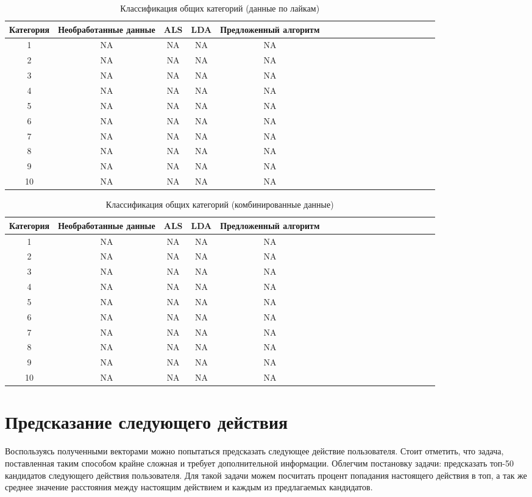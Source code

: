 \documentclass[times,specification,annotation]{itmo-student-thesis}
\begin{document}
\begin{table}[!h]
\caption{Классификация общих категорий (данные по лайкам)}\label{tab-likes}
\centering
\begin{tabular}{|*{18}{c|}}\hline
Категория & Необработанные данные & ALS & LDA & Предложенный алгоритм \\\hline
1  & NA & NA & NA & NA  \\\hline
2  & NA & NA & NA & NA \\\hline
3  & NA & NA & NA & NA \\\hline
4  & NA & NA & NA & NA \\\hline
5  & NA & NA & NA & NA  \\\hline
6  & NA & NA & NA & NA \\\hline
7  & NA & NA & NA & NA \\\hline
8  & NA & NA & NA & NA \\\hline
9  & NA & NA & NA & NA  \\\hline
10  & NA & NA & NA & NA \\\hline
\end{tabular}
\end{table}

\begin{table}[!h]
\caption{Классификация общих категорий (комбинированные данные)}\label{tab-combined}
\centering
\begin{tabular}{|*{18}{c|}}\hline
Категория & Необработанные данные & ALS & LDA & Предложенный алгоритм \\\hline
1  & NA & NA & NA & NA  \\\hline
2  & NA & NA & NA & NA \\\hline
3  & NA & NA & NA & NA \\\hline
4  & NA & NA & NA & NA \\\hline
5  & NA & NA & NA & NA  \\\hline
6  & NA & NA & NA & NA \\\hline
7  & NA & NA & NA & NA \\\hline
8  & NA & NA & NA & NA \\\hline
9  & NA & NA & NA & NA  \\\hline
10  & NA & NA & NA & NA \\\hline
\end{tabular}
\end{table}

\section{Предсказание следующего действия}
Воспользуясь полученными векторами можно попытаться предсказать следующее действие пользователя. Стоит отметить, что задача, поставленная таким способом крайне сложная и требует дополнительной информации. Облегчим постановку задачи: предсказать топ-50 кандидатов следующего действия пользователя. Для такой задачи можем посчитать процент попадания настоящего действия в топ, а так же среднее значение расстояния между настоящим действием и каждым из предлагаемых кандидатов. 
\end{document}
